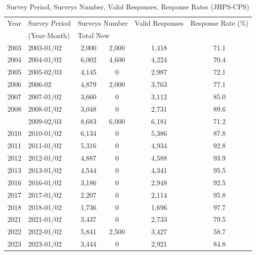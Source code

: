\documentclass[a4paper,12pt]{article}
\begin{document}
\begin{table}[h]
\centering
\footnotesize
\caption{Survey Period, Surveys Number, Valid Responses, Response Rates (JHPS-CPS)}
\label{tab:survey_stats}
\begin{tabular}{c l c c c c}
\toprule
Year & Survey Period & \multicolumn{2}{c}{Surveys Number} & Valid Responses & Response Rate (\%) \\
     & (Year-Month)  & \multicolumn{2}{l}{\scriptsize Total \quad\quad\enspace New} & & \\
\midrule
2003 & 2003-01/02 & 2,000 & 2,000 & 1,418 & 71.1 \\
2004 & 2004-01/02 & 6,002 & 4,600 & 4,224 & 70.4 \\
2005 & 2005-02/03 & 4,145 & 0 & 2,987 & 72.1 \\
2006 & 2006-02    & 4,879 & 2,000 & 3,763 & 77.1 \\
2007 & 2007-01/02 & 3,660 & 0 & 3,112 & 85.0 \\
2008 & 2008-01/02 & 3,048 & 0 & 2,731 & 89.6 \\
\arrayrulecolor{red}\hline\hline
2009 & 2009-02/03 & 8,683 & 6,000 & 6,181 & 71.2 \\
2010 & 2010-01/02 & 6,134 & 0 & 5,386 & 87.8 \\
2011 & 2011-01/02 & 5,316 & 0 & 4,934 & 92.8 \\
2012 & 2012-01/02 & 4,887 & 0 & 4,588 & 93.9 \\
2013 & 2013-01/02 & 4,544 & 0 & 4,341 & 95.5 \\
2016 & 2016-01/02 & 3,186 & 0 & 2,948 & 92.5 \\
2017 & 2017-01/02 & 2,207 & 0 & 2,114 & 95.8 \\
2018 & 2018-01/02 & 1,736 & 0 & 1,696 & 97.7 \\
\arrayrulecolor{red}\hline\hline
\arrayrulecolor{black}
2021 & 2021-01/02 & 3,437 & 0 & 2,733 & 79.5 \\
2022 & 2022-01/02 & 5,841 & 2,500 & 3,427 & 58.7 \\
2023 & 2023-01/02 & 3,444 & 0 & 2,921 & 84.8 \\
\bottomrule
\end{tabular}

\label{table:JHPS_CPS}

\end{table}

\end{document}
